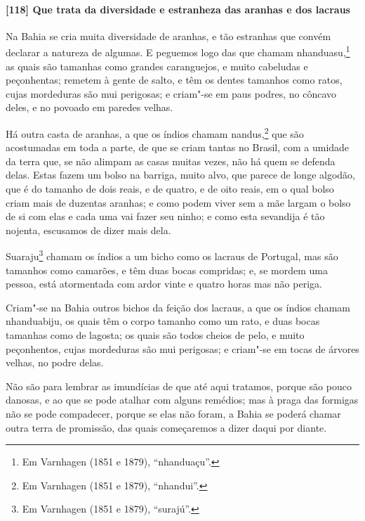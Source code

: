 \paragraph{[118] Que trata da diversidade e estranheza das aranhas e dos lacraus}\quad
Na Bahia se cria muita diversidade de aranhas, e tão estranhas que convém declarar a
natureza de algumas. E peguemos logo das que chamam nhanduasu,\footnote{ Em Varnhagen (1851
e 1879), ``nhanduaçu''.} as quais são tamanhas como grandes caranguejos, e muito
cabeludas e peçonhentas; remetem à gente de salto, e têm os dentes tamanhos como ratos,
cujas mordeduras são mui perigosas; e criam"-se em paus podres, no côncavo deles, e no
povoado em paredes velhas.

Há outra casta de aranhas, a que os índios chamam nandus,\footnote{ Em Varnhagen (1851 e
1879), ``nhandui''.} que são acostumadas em toda a parte, de que se criam tantas no
Brasil, com a umidade da terra que, se não alimpam as casas muitas vezes, não há quem se
defenda delas. Estas fazem um bolso na barriga, muito alvo, que parece de longe algodão,
que é do tamanho de dois reais, e de quatro, e de oito reais, em o qual bolso criam mais
de duzentas aranhas; e como podem viver sem a mãe largam o bolso de si com elas e cada uma
vai fazer seu ninho; e como esta sevandija é tão nojenta, escusamos de dizer mais dela.

Suaraju\footnote{ Em Varnhagen (1851 e 1879), ``surajú''.} chamam os índios a um bicho
como os lacraus de Portugal, mas são tamanhos como camarões, e têm duas bocas compridas;
e, se mordem uma pessoa, está atormentada com ardor vinte e quatro horas mas não periga.

Criam"-se na Bahia outros bichos da feição dos lacraus, a que os índios chamam nhanduabiju,
os quais têm o corpo tamanho como um rato, e duas bocas tamanhas como de lagosta; os quais
são todos cheios de pelo, e muito peçonhentos, cujas mordeduras são mui perigosas; e
criam"-se em tocas de árvores velhas, no podre delas.

Não são para lembrar as imundícias de que até aqui tratamos, porque são pouco danosas, e
ao que se pode atalhar com alguns remédios; mas à praga das formigas não se pode
compadecer, porque se elas não foram, a Bahia se poderá chamar outra terra de promissão,
das quais começaremos a dizer daqui por diante.

